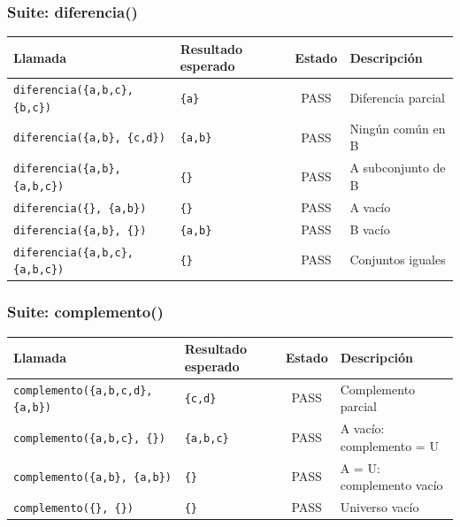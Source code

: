 \documentclass[11pt,a4paper]{article}
\begin{document}
\subsubsection{Suite: diferencia()}
\begin{table}[htbp]
\centering
\small
\begin{tabularx}{\textwidth}{llcX}
\toprule
\textbf{Llamada} & \textbf{Resultado esperado} & \textbf{Estado} & \textbf{Descripción} \\
\midrule
\texttt{diferencia(\{a,b,c\}, \{b,c\})} & \texttt{\{a\}} & PASS & Diferencia parcial \\
\texttt{diferencia(\{a,b\}, \{c,d\})} & \texttt{\{a,b\}} & PASS & Ningún común en B \\
\texttt{diferencia(\{a,b\}, \{a,b,c\})} & \texttt{\{\}} & PASS & A subconjunto de B \\
\texttt{diferencia(\{\}, \{a,b\})} & \texttt{\{\}} & PASS & A vacío \\
\texttt{diferencia(\{a,b\}, \{\})} & \texttt{\{a,b\}} & PASS & B vacío \\
\texttt{diferencia(\{a,b,c\},\{a,b,c\})} & \texttt{\{\}} & PASS & Conjuntos iguales \\
\bottomrule
\end{tabularx}
\end{table}

\subsubsection{Suite: complemento()}
\begin{table}[htbp]
\centering
\small
\begin{tabularx}{\textwidth}{llcX}
\toprule
\textbf{Llamada} & \textbf{Resultado esperado} & \textbf{Estado} & \textbf{Descripción} \\
\midrule
\texttt{complemento(\{a,b,c,d\}, \{a,b\})} & \texttt{\{c,d\}} & PASS & Complemento parcial \\
\texttt{complemento(\{a,b,c\}, \{\})} & \texttt{\{a,b,c\}} & PASS & A vacío: complemento = U \\
\texttt{complemento(\{a,b\}, \{a,b\})} & \texttt{\{\}} & PASS & A = U: complemento vacío \\
\texttt{complemento(\{\}, \{\})} & \texttt{\{\}} & PASS & Universo vacío \\
\bottomrule
\end{tabularx}
\end{table}
\end{document}

